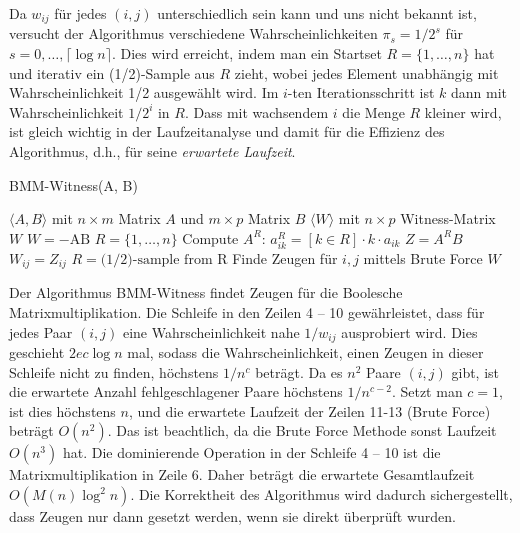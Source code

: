 \documentclass{scrartcl}
\numberwithin{equation}{section}
\begin{document}
Da $w_{ij}$ für jedes $(i, j)$ unterschiedlich sein kann und uns nicht bekannt ist, versucht der Algorithmus verschiedene Wahrscheinlichkeiten $\pi_s = 1/2^s$ für $s = 0, \ldots, \lceil \log n \rceil$. Dies wird erreicht, indem man ein Startset $R = \{1, \ldots, n\}$ hat und iterativ ein (1/2)-Sample aus $R$ zieht, wobei jedes Element unabhängig mit Wahrscheinlichkeit 1/2 ausgewählt wird. Im $i$-ten Iterationsschritt ist $k$ dann mit Wahrscheinlichkeit $1/2^i$ in $R$. Dass mit wachsendem $i$ die Menge $R$ kleiner wird, ist  gleich wichtig in der Laufzeitanalyse und damit für die Effizienz des Algorithmus, d.h., für seine \textit{erwartete Laufzeit}.
\begin{algorithm}
	\caption{BMM-Witness(A, B)}
	\label{alg:bmm_witness_rand}
	\begin{algorithmic}[1]
		\Require $\langle A, B \rangle$ mit $n \times m$ Matrix $A$ und $m \times p$ Matrix $B$
		\Ensure $\langle W \rangle$ mit $n \times p$ Witness-Matrix $W$
		\State $W = -\text{AB}$ 
		\State $R = \{1, \ldots, n\}$
		\State Compute $A^R$: $a_{ik}^R = [k \in R] \cdot k \cdot a_{ik}$ 
		\State $Z = A^R B$
		 
		\State $W_{ij} = Z_{ij}$
		\EndIf
		\EndFor
		\State $R = \text{(1/2)-sample from R}$
		\EndFor
		\EndFor
		\State Finde Zeugen für $i, j$ mittels Brute Force 
		\EndIf
		\EndFor
		\State \Return $W$
	\end{algorithmic}
\end{algorithm}
Der Algorithmus BMM-Witness findet Zeugen für die Boolesche Matrixmultiplikation. Die Schleife in den Zeilen 4 -- 10 gewährleistet, dass für jedes Paar $(i, j)$ eine Wahrscheinlichkeit nahe $1/w_{ij}$ ausprobiert wird. Dies geschieht $2ec \log n$ mal, sodass die Wahrscheinlichkeit, einen Zeugen in dieser Schleife nicht zu finden, höchstens $1/n^c$ beträgt. Da es $n^2$ Paare $(i, j)$ gibt, ist die erwartete Anzahl fehlgeschlagener Paare höchstens $1/n^{c-2}$. Setzt man $c=1$, ist dies höchstens $n$, und die erwartete Laufzeit der Zeilen 11-13 (Brute Force) beträgt $O(n^2)$. Das ist beachtlich, da die Brute Force Methode sonst Laufzeit $O(n^3)$ hat. Die dominierende Operation in der Schleife 4 -- 10 ist die Matrixmultiplikation in Zeile 6. Daher beträgt die erwartete Gesamtlaufzeit $O(M(n) \log^2 n)$. Die Korrektheit des Algorithmus wird dadurch sichergestellt, dass Zeugen nur dann gesetzt werden, wenn sie direkt überprüft wurden.
\end{document}
